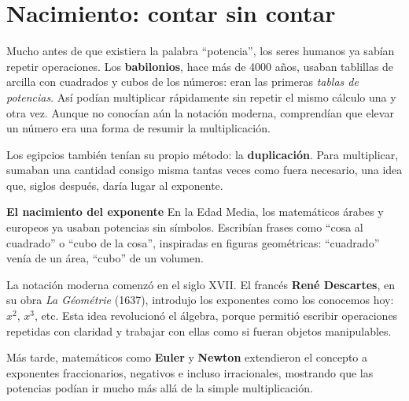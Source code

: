 
\vspace{0.5cm}

\vspace{1em} %
\section*{Nacimiento: contar sin contar}

\begin{reseñaplana}
Mucho antes de que existiera la palabra “potencia”, los seres humanos ya sabían repetir operaciones.  
Los \textbf{babilonios}, hace más de 4000 años, usaban tablillas de arcilla con cuadrados y cubos de 
los números: eran las primeras \textit{tablas de potencias}.  
Así podían multiplicar rápidamente sin repetir el mismo cálculo una y otra vez.  
Aunque no conocían aún la notación moderna, comprendían que elevar un número era una forma de resumir la multiplicación.  

Los egipcios también tenían su propio método: la \textbf{duplicación}.  
Para multiplicar, sumaban una cantidad consigo misma tantas veces como fuera necesario, una idea que, 
siglos después, daría lugar al exponente. 

\textbf{El nacimiento del exponente}  
En la Edad Media, los matemáticos árabes y europeos ya usaban potencias sin símbolos.  
Escribían frases como “cosa al cuadrado” o “cubo de la cosa”, inspiradas en figuras geométricas:  
“cuadrado” venía de un área, “cubo” de un volumen.  

La notación moderna comenzó en el siglo XVII.  
El francés \textbf{René Descartes}, en su obra \textit{La Géométrie} (1637), introdujo los exponentes 
como los conocemos hoy: $x^2$, $x^3$, etc.  
Esta idea revolucionó el álgebra, porque permitió escribir operaciones repetidas con claridad y 
trabajar con ellas como si fueran objetos manipulables.  

Más tarde, matemáticos como \textbf{Euler} y \textbf{Newton} extendieron el concepto a exponentes 
fraccionarios, negativos e incluso irracionales, mostrando que las potencias podían ir mucho más 
allá de la simple multiplicación.  
\end{reseñaplana}

